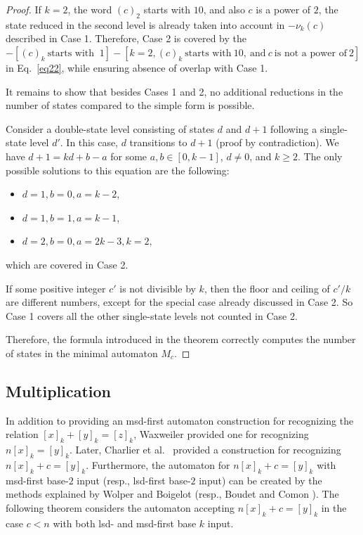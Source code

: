 \documentclass[12pt,reqno]{article}
\begin{document}
\begin{proof}
    If $k=2$, the word $(c)_2$ starts with $10$, and also $c$ is a power of $2$, the state reduced in the second level is already taken into account in $-\nu_k(c)$ described in Case 1. Therefore, Case 2 is covered by the $-[(c)_k \ \text{starts with } \ 1] - [k=2, (c)_k \ \text{starts with} \ 10, \ \text{and} \ c \ \text{is not a power of} \ 2 ]$ in Eq.~\eqref{eq22}, while ensuring absence of overlap with Case 1.

    \bigskip

    It remains to show that besides Cases 1 and 2, no additional reductions in the number of states compared to the simple form is possible.

    Consider a double-state level consisting of states $d$ and $d+1$ following a single-state level $d'$. In this case, $d$ transitions to $d+1$ (proof by contradiction). We have $d+1 = kd + b -a $ for some $a, b \in [0, k-1]$, $d \neq 0$, and $k \geq 2$. The only possible solutions to this equation are the following:
\begin{itemize}[nosep]
    \item $d=1,b=0, a=k-2$,
    \item $d=1, b=1, a=k-1$,
    \item $d=2, b=0, a=2k-3, k=2,$
\end{itemize}    
which are covered in Case 2.

    If some positive integer $c'$ is not divisible by $k$, then the floor and ceiling of $c'/k$ are different numbers, except for the special case already discussed in Case 2. So Case 1 covers all the other single-state levels not counted in Case 2.

    Therefore, the formula introduced in the theorem correctly computes the number of states in the minimal automaton $M_c$.
\end{proof}

\subsection{Multiplication}

In addition to providing an msd-first automaton construction for recognizing the relation $[x]_k + [y]_k = [z]_k$, Waxweiler \cite[Proposition 4.4.3]{waxweiler_caractere_2009} provided one for recognizing $n[x]_k = [y]_k$. Later,
Charlier et al.~\cite{charlier_minimal_2021} provided a construction for recognizing $n[x]_k +c = [y]_k$. Furthermore, the automaton for $n[x]_k + c =[y]_k$ with msd-first base-$2$ input (resp., lsd-first base-$2$ input) can be created by the methods explained  by Wolper and Boigelot \cite{wolper_construction_2000} (resp., Boudet and Comon \cite{boudet_diophantine_1996}). The following theorem considers the automaton accepting $n[x]_k + c = [y]_k$ in the case $c < n$ with both lsd- and msd-first base $k$ input.
\end{document}
